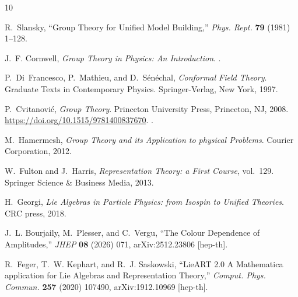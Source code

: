 \documentclass[12pt,a4paper]{article}\let\ifpdf\relax
\begin{document}
\newpage
\providecommand{\href}[2]{#2}\begingroup\raggedright\begin{thebibliography}{10}

R.~Slansky, ``{Group Theory for Unified Model Building},''
  \href{http://dx.doi.org/10.1016/0370-1573(81)90092-2}{{\em Phys. Rept.} {\bf
  79} (1981)  1--128}.

J.~F. Cornwell, {\em {Group Theory in Physics: An Introduction}}.
.

P.~Di~Francesco, P.~Mathieu, and D.~S\'en\'echal,
  \href{http://dx.doi.org/10.1007/978-1-4612-2256-9}{{\em {Conformal Field
  Theory}}}.
\newblock Graduate Texts in Contemporary Physics. Springer-Verlag, New York,
  1997.

P.~Cvitanovi\'{c}, \href{http://dx.doi.org/10.1515/9781400837670}{{\em {Group
  Theory}}}.
\newblock Princeton University Press, Princeton, NJ, 2008.
\newblock \url{https://doi.org/10.1515/9781400837670}.
.

M.~Hamermesh, {\em {Group Theory and its Application to physical Problems}}.
\newblock Courier Corporation, 2012.

W.~Fulton and J.~Harris, {\em {Representation Theory: a First Course}},
  vol.~129.
\newblock Springer Science \& Business Media, 2013.

H.~Georgi, {\em {Lie Algebras in Particle Physics: from Isospin to Unified
  Theories}}.
\newblock CRC press, 2018.

J.~L. Bourjaily, M.~Plesser, and C.~Vergu, ``{The Colour Dependence of
  Amplitudes},'' \href{http://dx.doi.org/10.1007/JHEP08(2026)071}{{\em JHEP}
  {\bf 08} (2026)  071}, \href{http://arxiv.org/abs/2512.23806}{{
  arXiv:2512.23806 [hep-th]}}.

R.~Feger, T.~W. Kephart, and R.~J. Saskowski, ``{LieART 2.0 \textendash{} A
  Mathematica application for Lie Algebras and Representation Theory},''
  \href{http://dx.doi.org/10.1016/j.cpc.2020.107490}{{\em Comput. Phys.
  Commun.} {\bf 257} (2020)  107490}, \href{http://arxiv.org/abs/1912.10969}{{
  arXiv:1912.10969 [hep-th]}}.


\end{thebibliography}
\end{document}
